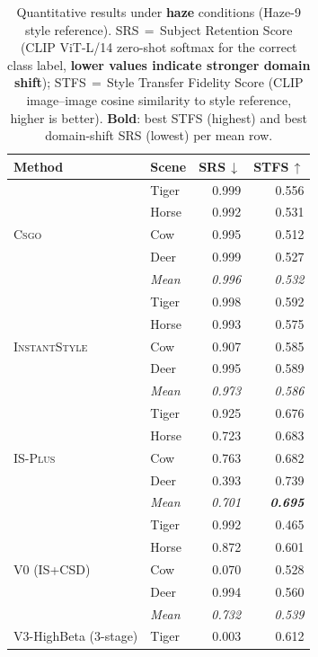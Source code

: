 \begin{table}[htbp]
  \centering\small
  \caption{Quantitative results under \textbf{haze} conditions (Haze-9 style reference). SRS\,$=$\,Subject Retention Score (CLIP ViT-L/14 zero-shot softmax for the correct class label, \textbf{lower values indicate stronger domain shift}); STFS\,$=$\,Style Transfer Fidelity Score (CLIP image--image cosine similarity to style reference, higher is better). \textbf{Bold}: best STFS (highest) and best domain-shift SRS (lowest) per mean row.}
  \label{tab:metrics_haze}
  \setlength{\tabcolsep}{4pt}
  \renewcommand{\arraystretch}{0.92}
  \begin{tabular}{@{}llrr@{}}
    \toprule
    \textbf{Method} & \textbf{Scene} & \textbf{SRS\,$\downarrow$} & \textbf{STFS\,$\uparrow$} \\
    \midrule
    \multirow{5}{*}{\textsc{Csgo}} & Tiger & 0.999 & 0.556 \\
    & Horse & 0.992 & 0.531 \\
    & Cow & 0.995 & 0.512 \\
    & Deer & 0.999 & 0.527 \\
    & \textit{Mean} & \textit{0.996} & \textit{0.532} \\
    \midrule
    \multirow{5}{*}{\textsc{InstantStyle}} & Tiger & 0.998 & 0.592 \\
    & Horse & 0.993 & 0.575 \\
    & Cow & 0.907 & 0.585 \\
    & Deer & 0.995 & 0.589 \\
    & \textit{Mean} & \textit{0.973} & \textit{0.586} \\
    \midrule
    \multirow{5}{*}{\textsc{IS-Plus}} & Tiger & 0.925 & 0.676 \\
    & Horse & 0.723 & 0.683 \\
    & Cow & 0.763 & 0.682 \\
    & Deer & 0.393 & 0.739 \\
    & \textit{Mean} & \textit{0.701} & \textit{\textbf{0.695}} \\
    \midrule
    \multirow{5}{*}{V0 (IS+CSD)} & Tiger & 0.992 & 0.465 \\
    & Horse & 0.872 & 0.601 \\
    & Cow & 0.070 & 0.528 \\
    & Deer & 0.994 & 0.560 \\
    & \textit{Mean} & \textit{0.732} & \textit{0.539} \\
    \midrule
    \multirow{5}{*}{V3-HighBeta (3-stage)} & Tiger & 0.003 & 0.612 \\

\end{tabular}
\end{table}
